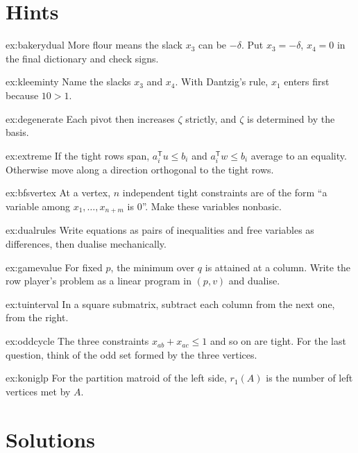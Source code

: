 \section{Hints}

\begin{hint}{ex:bakerydual}
More flour means the slack $x_3$ can be $-\delta$. Put $x_3=-\delta$, $x_4=0$ in the final dictionary and check signs.
\end{hint}
\begin{hint}{ex:kleeminty}
Name the slacks $x_3$ and $x_4$. With Dantzig's rule, $x_1$ enters first because $10>1$.
\end{hint}
\begin{hint}{ex:degenerate}
Each pivot then increases $\zeta$ strictly, and $\zeta$ is determined by the basis.
\end{hint}
\begin{hint}{ex:extreme}
If the tight rows span, $a_i^{\mathsf T}u\le b_i$ and $a_i^{\mathsf T}w\le b_i$ average to an equality. Otherwise move along a direction orthogonal to the tight rows.
\end{hint}
\begin{hint}{ex:bfsvertex}
At a vertex, $n$ independent tight constraints are of the form ``a variable among $x_1,\dots,x_{n+m}$ is $0$''. Make these variables nonbasic.
\end{hint}
\begin{hint}{ex:dualrules}
Write equations as pairs of inequalities and free variables as differences, then dualise mechanically.
\end{hint}
\begin{hint}{ex:gamevalue}
For fixed $p$, the minimum over $q$ is attained at a column. Write the row player's problem as a linear program in $(p,v)$ and dualise.
\end{hint}
\begin{hint}{ex:tuinterval}
In a square submatrix, subtract each column from the next one, from the right.
\end{hint}
\begin{hint}{ex:oddcycle}
The three constraints $x_{ab}+x_{ac}\le1$ and so on are tight. For the last question, think of the odd set formed by the three vertices.
\end{hint}
\begin{hint}{ex:koniglp}
For the partition matroid of the left side, $r_1(A)$ is the number of left vertices met by $A$.
\end{hint}

\section{Solutions}


